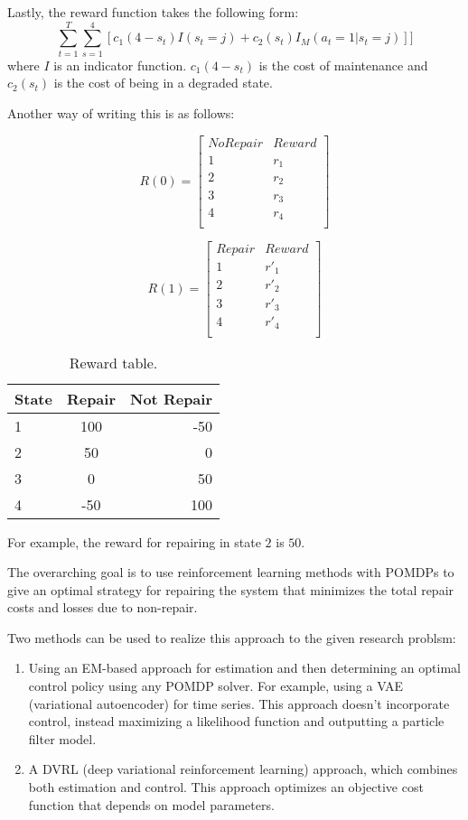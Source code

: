 \documentclass[english]{article}
\numberwithin{equation}{section}
\begin{document}
	Lastly, the reward function takes the following form:
	$$\sum_{t=1}^T \sum_{s=1}^4 [c_1(4-s_t)I(s_t=j) + c_2(s_t)I_M(a_t=1|s_t=j)]]$$
	where $I$ is an indicator function. $c_1(4-s_t)$ is the cost of maintenance and $c_2(s_t)$ is the cost of being in a degraded state.
	
	Another way of writing this is as follows:
	
	$$
	R(0) = 
	\begin{bmatrix}
	No Repair & Reward \\
	1 & r_1 \\
	2 & r_2 \\
	3 & r_3 \\
	4 & r_4 \\
	\end{bmatrix}
	$$
	
	$$
	R(1) = 
	\begin{bmatrix}
	Repair & Reward \\
	1 & r'_1 \\
	2 & r'_2 \\
	3 & r'_3 \\
	4 & r'_4 \\
	\end{bmatrix}
	$$
	 
	 \begin{table}[h!]
	 	\begin{center}
	 		\caption{Reward table.}
	 		\label{tab:table1}
	 		\begin{tabular}{l|c|r} %
	 			\textbf{State} & \textbf{Repair} & \textbf{Not Repair}\\
	 			\hline
	 			1 & 100 & -50\\
	 			2 & 50 & 0\\
	 			3 & 0 & 50\\
	 			4 & -50 & 100
	 		\end{tabular}
	 	\end{center}
	 \end{table}
	 
	 For example, the reward for repairing in state $2$ is $50$.
	
	The overarching goal is to use reinforcement learning methods with POMDPs to give an optimal strategy for repairing the system that minimizes the total repair costs and losses due to non-repair.
	
	Two methods can be used to realize this approach to the given research problsm:
	\begin{enumerate}
		\item Using an EM-based approach for estimation and then determining an optimal control policy using any POMDP solver. For example, using a VAE (variational autoencoder) for time series. This approach doesn't incorporate control, instead maximizing a likelihood function and outputting a particle filter model.
		\item A DVRL (deep variational reinforcement learning) approach, which combines both estimation and control. This approach optimizes an objective cost function that depends on model parameters.
	\end{enumerate}
	
\end{document}
